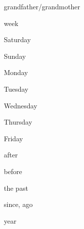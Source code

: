 \begin{flashcard}{\LARGE grandfather/grandmother}
\LARGE {}
\end{flashcard}
\begin{flashcard}{\LARGE week}
\LARGE {}
\end{flashcard}
\begin{flashcard}{\LARGE Saturday}
\LARGE {}
\end{flashcard}
\begin{flashcard}{\LARGE Sunday}
\LARGE {}
\end{flashcard}
\begin{flashcard}{\LARGE Monday}
\LARGE {}
\end{flashcard}
\begin{flashcard}{\LARGE Tuesday}
\LARGE {}
\end{flashcard}
\begin{flashcard}{\LARGE Wednesday}
\LARGE {}
\end{flashcard}
\begin{flashcard}{\LARGE Thursday}
\LARGE {}
\end{flashcard}
\begin{flashcard}{\LARGE Friday}
\LARGE {}
\end{flashcard}
\begin{flashcard}{\LARGE after}
\LARGE {}
\end{flashcard}
\begin{flashcard}{\LARGE before}
\LARGE {}
\end{flashcard}
\begin{flashcard}{\LARGE the past}
\LARGE {}
\end{flashcard}
\begin{flashcard}{\LARGE since, ago}
\LARGE {}
\end{flashcard}
\begin{flashcard}{\LARGE year}
\LARGE {}
\end{flashcard}
